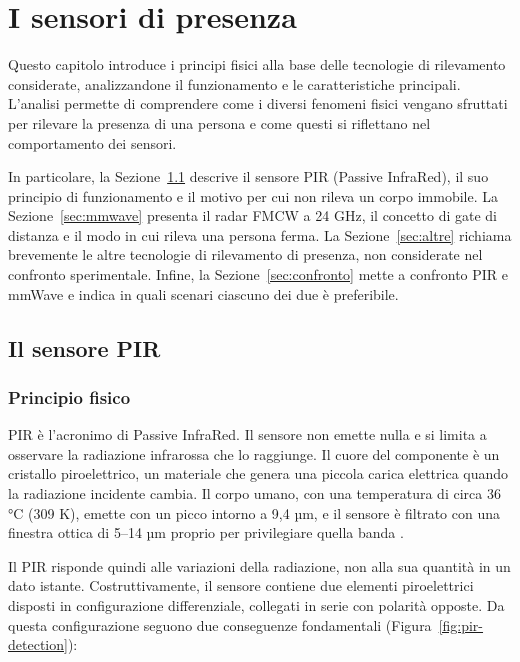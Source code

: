 \chapter{I sensori di presenza}
\label{chap:sensori}

Questo capitolo introduce i principi fisici alla base delle tecnologie di rilevamento considerate, analizzandone il funzionamento e le caratteristiche principali. L'analisi permette di comprendere come i diversi fenomeni fisici vengano sfruttati per rilevare la presenza di una persona e come questi si riflettano nel comportamento dei sensori.

In particolare, la Sezione~\ref{sec:pir} descrive il sensore PIR (Passive InfraRed), il suo principio di funzionamento e il motivo per cui non rileva un corpo immobile. La Sezione~\ref{sec:mmwave} presenta il radar FMCW a 24 GHz, il concetto di gate di distanza e il modo in cui rileva una persona ferma. La Sezione~\ref{sec:altre} richiama brevemente le altre tecnologie di rilevamento di presenza, non considerate nel confronto sperimentale. Infine, la Sezione~\ref{sec:confronto} mette a confronto PIR e mmWave e indica in quali scenari ciascuno dei due è preferibile.


\section{Il sensore PIR}
\label{sec:pir}

\subsection{Principio fisico}
\label{subsec:pir-principio}

PIR è l'acronimo di Passive InfraRed. Il sensore non emette nulla e si limita a osservare la radiazione infrarossa che lo raggiunge. Il cuore del componente è un cristallo piroelettrico, un materiale che genera una piccola carica elettrica quando la radiazione incidente cambia. Il corpo umano, con una temperatura di circa 36 °C (309 K), emette con un picco intorno a 9,4 µm, e il sensore è filtrato con una finestra ottica di 5–14 µm proprio per privilegiare quella banda \cite{niceraPyro}.

Il PIR risponde quindi alle variazioni della radiazione, non alla sua quantità in un dato istante. Costruttivamente, il sensore contiene due elementi piroelettrici disposti in configurazione differenziale, collegati in serie con polarità opposte. Da questa configurazione seguono due conseguenze fondamentali (Figura~\ref{fig:pir-detection}):


